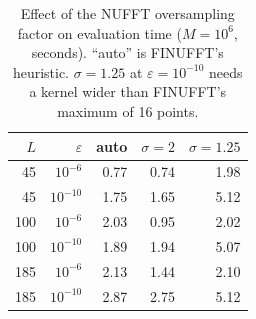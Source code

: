 \begin{table}[!htbp]\centering\small
\caption{Effect of the NUFFT oversampling factor on evaluation time ($M=10^6$, seconds). ``auto'' is FINUFFT's heuristic.
$\sigma=1.25$ at $\varepsilon=10^{-10}$ needs a kernel wider than FINUFFT's maximum of 16 points.}\label{tab:upsamp}
\begin{tabular}{rrrrr}\toprule $L$&$\varepsilon$&auto&$\sigma=2$&$\sigma=1.25$\\\midrule
45 & $10^{-6}$ & 0.77 & 0.74 & 1.98\\
45 & $10^{-10}$ & 1.75 & 1.65 & 5.12\\
100 & $10^{-6}$ & 2.03 & 0.95 & 2.02\\
100 & $10^{-10}$ & 1.89 & 1.94 & 5.07\\
185 & $10^{-6}$ & 2.13 & 1.44 & 2.10\\
185 & $10^{-10}$ & 2.87 & 2.75 & 5.12\\
\bottomrule\end{tabular}\end{table}

